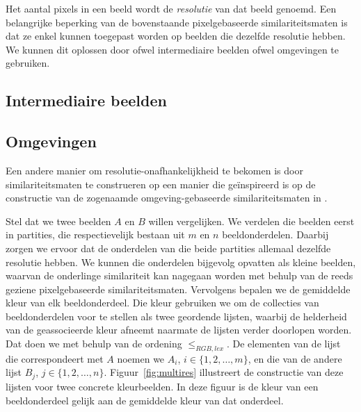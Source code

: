 Het aantal pixels in een beeld wordt de \emph{resolutie} van dat beeld genoemd.
Een belangrijke beperking van de bovenstaande pixelgebaseerde similariteitsmaten is dat
ze enkel kunnen toegepast worden op beelden die dezelfde resolutie hebben.
We kunnen dit oplossen door ofwel intermediaire beelden ofwel omgevingen te gebruiken.

\subsection{Intermediaire beelden}


\subsection{Omgevingen}

Een andere manier om resolutie-onafhankelijkheid te bekomen is door similariteitsmaten te construeren 
op een manier die ge\"inspireerd is op de constructie van de zogenaamde omgeving-gebaseerde 
similariteitsmaten in \cite{vanderweken:similariteitsmaten}. 

Stel dat we twee beelden $A$ en $B$ willen
vergelijken. We verdelen
die beelden eerst in partities, die respectievelijk bestaan uit
$m$ en $n$ beeldonderdelen. Daarbij zorgen we ervoor dat de onderdelen
van die beide partities allemaal dezelfde resolutie hebben. We kunnen die onderdelen bijgevolg 
opvatten als kleine beelden, waarvan de onderlinge similariteit kan nagegaan worden met behulp van de reeds 
geziene pixelgebaseerde similariteitsmaten.
Vervolgens bepalen we de gemiddelde kleur van elk beeldonderdeel. Die kleur gebruiken we om
de collecties van beeldonderdelen voor te stellen als twee geordende lijsten, waarbij de 
helderheid van de geassocieerde kleur afneemt naarmate de lijsten verder doorlopen worden.
Dat doen we met behulp van de ordening $\leq_{RGB,lex}$. 
De elementen van de lijst die correspondeert met $A$ noemen 
we $A_i$, $i \in \{1,2,\ldots,m\}$, en die van de andere lijst $B_j$, $j \in \{1,2,\ldots,n\}$.
Figuur~\ref{fig:multires} illustreert de constructie van deze lijsten voor twee concrete
kleurbeelden. In deze figuur is de kleur van een beeldonderdeel gelijk aan de gemiddelde 
kleur van dat onderdeel.

